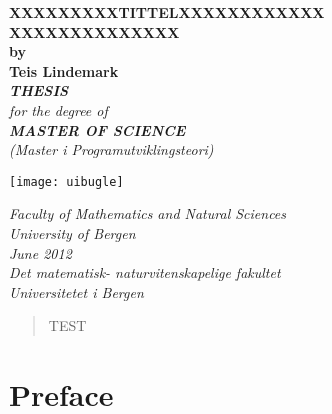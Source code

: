 \documentclass[12pt,twoside,onecolumn]{article}
\begin{document}
\thispagestyle{empty}
\begin{center}        %
  \vspace{5mm}          %
  \LARGE
  \textbf{XXXXXXXXXTITTELXXXXXXXXXXXX\\ XXXXXXXXXXXXXX} \\
  \Large
  \vspace{5mm}
  \textbf{by} \\
  \vspace{5mm}
  \large
  \textbf{Teis Lindemark} \\
  \vspace{30mm}
  \Large
  {\bf{\textsl{THESIS}}} \\
  \textsl{for the degree of} \\
  \vspace{2mm}
  {\bf{\textsl{MASTER OF SCIENCE}}} \\
  \vspace{5mm}
  {\large \textsl {(Master i Programutviklingsteori)}}\\
  \vspace{10mm}
  \centerline{\texttt{[image: uibugle]}}
  \vspace{5mm}
  \textsl{Faculty of Mathematics and Natural Sciences} \\
  \textsl{University of Bergen} \\
  \vspace{10mm}
  \large
  \textsl{June 2012} \\
  \vspace{5mm}
  \normalsize
  \textsl{Det matematisk- naturvitenskapelige fakultet} \\
  \textsl{Universitetet i Bergen} \\
\end{center}

\begin{abstract}
TEST
\end{abstract}
\newpage

\tableofcontents
\newpage

\section{Preface}
\newpage
\end{document}
